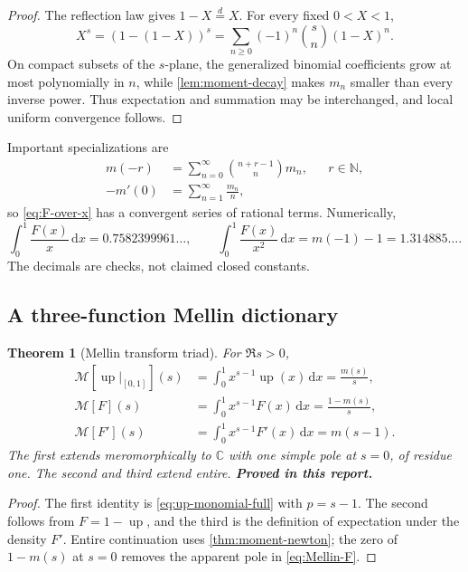 \documentclass[11pt,oneside]{article}
\numberwithin{equation}{section}
\newtheorem{theorem}{Theorem}[section]
\theoremstyle{definition}
\theoremstyle{remark}
\newcommand{\C}{\mathbb C}
\newcommand{\N}{\mathbb N}
\newcommand{\Up}{\operatorname{up}}
\newcommand{\dd}{\,\mathrm d}
\newcommand{\Mellin}{\mathcal M}
\newcommand{\statusproved}{\textcolor{proofgreen}{\textbf{Proved in this report.}}}
\begin{document}
\begin{proof}
The reflection law gives \(1-X\stackrel d=X\).  For every fixed \(0<X<1\),
\[
 X^s=(1-(1-X))^s
 =\sum_{n\ge0}(-1)^n\binom{s}{n}(1-X)^n.
\]
On compact subsets of the \(s\)-plane, the generalized binomial coefficients
grow at most polynomially in \(n\), while \cref{lem:moment-decay} makes \(m_n\)
smaller than every inverse power.  Thus expectation and summation may be
interchanged, and local uniform convergence follows.
\end{proof}

Important specializations are
\begin{align}
 m(-r)&=\sum_{n=0}^{\infty}\binom{n+r-1}{n}m_n,
 &&r\in\N,
 \label{eq:negative-moments-series}\\
 -m'(0)&=\sum_{n=1}^{\infty}\frac{m_n}{n},
 \label{eq:log-moment-series}
\end{align}
so \eqref{eq:F-over-x} has a convergent series of rational terms.  Numerically,
\begin{equation}
 \int_0^1\frac{F(x)}x\dd x
 =0.7582399961\ldots,
 \qquad
 \int_0^1\frac{F(x)}{x^2}\dd x
 =m(-1)-1=1.314885\ldots.
 \label{eq:negative-examples}
\end{equation}
The decimals are checks, not claimed closed constants.

\subsection{A three-function Mellin dictionary}

\begin{theorem}[Mellin transform triad]
\label{thm:mellin-triad}
For \(\Re s>0\),
\begin{align}
 \Mellin[\Up|_{[0,1]}](s)
 &=\int_0^1x^{s-1}\Up(x)\dd x
 =\frac{m(s)}s,
 \label{eq:Mellin-up}\\
 \Mellin[F](s)
 &=\int_0^1x^{s-1}F(x)\dd x
 =\frac{1-m(s)}s,
 \label{eq:Mellin-F}\\
 \Mellin[F'](s)
 &=\int_0^1x^{s-1}F'(x)\dd x
 =m(s-1).
 \label{eq:Mellin-density}
\end{align}
The first extends meromorphically to \(\C\) with one simple pole at \(s=0\),
of residue one.  The second and third extend entire.  \statusproved
\end{theorem}

\begin{proof}
The first identity is \eqref{eq:up-monomial-full} with \(p=s-1\).  The second
follows from \(F=1-\Up\), and the third is the definition of expectation under
the density \(F'\).  Entire continuation uses \cref{thm:moment-newton}; the zero
of \(1-m(s)\) at \(s=0\) removes the apparent pole in \eqref{eq:Mellin-F}.
\end{proof}
\end{document}
